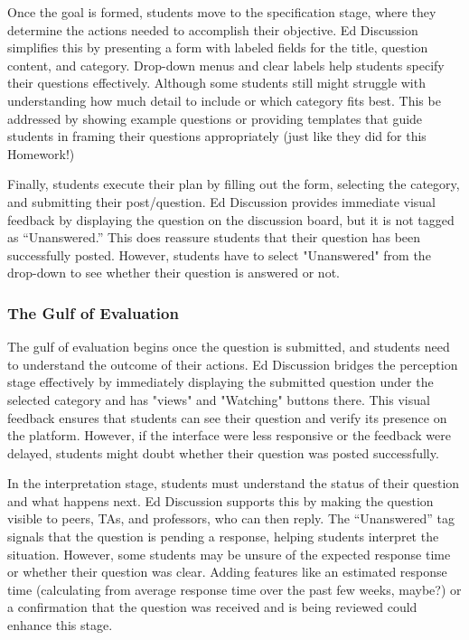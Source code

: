 \documentclass[
	letterpaper, %
]{jdf}
\begin{document}
Once the goal is formed, students move to the specification stage, where they determine the actions needed to accomplish their objective. Ed Discussion simplifies this by presenting a form with labeled fields for the title, question content, and category. Drop-down menus and clear labels help students specify their questions effectively. Although some students still might struggle with understanding how much detail to include or which category fits best. This be addressed by showing example questions or providing templates that guide students in framing their questions appropriately (just like they did for this Homework!) 

Finally, students execute their plan by filling out the form, selecting the category, and submitting their post/question. Ed Discussion provides immediate visual feedback by displaying the question on the discussion board, but it is not tagged as “Unanswered.” This does reassure students that their question has been successfully posted. However, students have to select "Unanswered" from the drop-down to see whether their question is answered or not. 

\subsubsection {The Gulf of Evaluation}
The gulf of evaluation begins once the question is submitted, and students need to understand the outcome of their actions. Ed Discussion bridges the perception stage effectively by immediately displaying the submitted question under the selected category and has "views" and "Watching" buttons there. This visual feedback ensures that students can see their question and verify its presence on the platform. However, if the interface were less responsive or the feedback were delayed, students might doubt whether their question was posted successfully.

In the interpretation stage, students must understand the status of their question and what happens next. Ed Discussion supports this by making the question visible to peers, TAs, and professors, who can then reply. The “Unanswered” tag signals that the question is pending a response, helping students interpret the situation. However, some students may be unsure of the expected response time or whether their question was clear. Adding features like an estimated response time (calculating from average response time over the past few weeks, maybe?) or a confirmation that the question was received and is being reviewed could enhance this stage.
\end{document}
